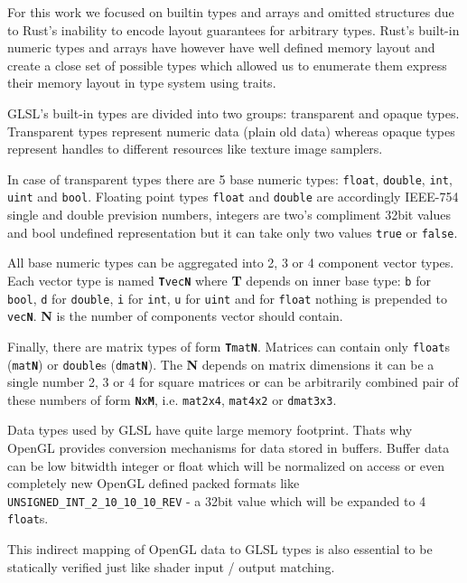 For this work we focused on builtin types and arrays and omitted structures due to Rust's inability to encode layout guarantees for arbitrary types.
Rust's built-in numeric types and arrays have however have well defined memory layout and create a close set of possible types which allowed us to enumerate them express their memory layout in type system using traits.

GLSL's built-in types are divided into two groups: transparent and opaque types.
Transparent types represent numeric data (plain old data) whereas opaque types represent handles to different resources like texture image samplers.

In case of transparent types there are 5 base numeric types: \texttt{float}, \texttt{double}, \texttt{int}, \texttt{uint} and \texttt{bool}.
Floating point types \texttt{float} and \texttt{double} are accordingly IEEE-754 single and double prevision numbers, integers are two's compliment 32bit values and bool undefined representation but it can take only two values \texttt{true} or \texttt{false}.

All base numeric types can be aggregated into 2, 3 or 4 component vector types. Each vector type is named \texttt{\textbf{T}vec\textbf{N}}
where \textbf{T} depends on inner base type: \texttt{b} for \texttt{bool}, \texttt{d} for \texttt{double}, \texttt{i} for \texttt{int}, \texttt{u} for \texttt{uint} and for \texttt{float} nothing is prepended to \texttt{vec\textbf{N}}.
\textbf{N} is the number of components vector should contain.

Finally, there are matrix types of form \texttt{\textbf{T}mat\textbf{N}}. Matrices can contain only \texttt{float}s (\texttt{mat\textbf{N}}) or \texttt{double}s (\texttt{dmat\textbf{N}}).
The \textbf{N} depends on matrix dimensions it can be a single number 2, 3 or 4 for square matrices or can be arbitrarily combined pair of these numbers of form \texttt{\textbf{N}x\textbf{M}},
i.e. \texttt{mat2x4}, \texttt{mat4x2} or \texttt{dmat3x3}.

Data types used by GLSL have quite large memory footprint. Thats why OpenGL provides conversion mechanisms for data stored in buffers. Buffer data can be low bitwidth integer or float which will be normalized on access or even completely new OpenGL defined packed formats like \texttt{UNSIGNED\_INT\_2\_10\_10\_10\_REV} - a 32bit value which will be expanded to 4 \texttt{float}s. 

This indirect mapping of OpenGL data to GLSL types is also essential to be statically verified just like shader input / output matching.

